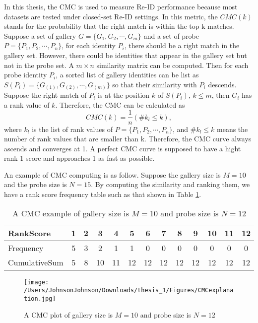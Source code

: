 In this thesis, the CMC is used to measure Re-ID performance because most datasets are tested under closed-set Re-ID settings. In this metric, the $CMC(k)$ stands for the probability that the right match is within the top k matches. Suppose a set of gallery $G = \{G_1,G_2,\cdots,G_m\}$ and a set of probe $P = \{P_1,P_2,\cdots,P_n\}$, for each identity $P_i$, there should be a right match in the gallery set. However, there could be identities that appear in the gallery set but not in the probe set. A $m\times n$ similarity matrix can be computed. Then for each probe identity $P_i$, a sorted list of gallery identities can be list as $S(P_i) = \{{G_{(1)},G_{(2)},\cdots,G_{(m)}}\}$ so that their similarity with $P_i$ descends. Suppose the right match of $P_i$ is at the position $k$ of $S(P_i)$, $k\le m$, then $G_i$ has a rank value of $k$. Therefore, the CMC can be calculated as 
\begin{equation}
CMC(k) = \frac{1}{n}(\#k_l\le k),
\end{equation}
where $k_l$ is the list of rank values of $P = \{P_1,P_2,\cdots,P_n\}$, and $\#k_l\le k$ means the number of rank values that are smaller than k.  Therefore, the CMC curve always ascends and converges at 1.  A perfect CMC curve is supposed to have a hight rank 1 score and approaches 1 as fast as possible.

An example of CMC computing is as follow. Suppose the gallery size is $M=10$ and the probe size is $N=15$. By computing the similarity and ranking them, we have a rank score frequency table such  as that shown in Table \ref{CMCcomputingdemo}.
\begin{table}[H]
\centering
\caption{A CMC example of gallery size is $M=10$ and probe size is $N=12$}
\label{CMCcomputingdemo}
\begin{tabular}{|l|c|c|c|c|c|c|c|c|c|c|c|c|}
\hline
RankScore &1&2&3&4&5&6&7&8&9&10&11&12\\
\hline
Frequency &5&3&2&1&1&0&0&0&0&0&0&0\\
\hline
CumulativeSum&5&8&10&11&12&12&12&12&12&12&12&12\\
\hline
\end{tabular}
\end{table}

\begin{figure}[H]
\centering
\texttt{[image: /Users/JohnsonJohnson/Downloads/thesis\_1/Figures/CMCexplanation.jpg]}
\caption{A CMC plot of  gallery size is $M=10$ and probe size is $N=12$}
\label{CMCexplanationplot}
\vspace{-1em}
\end{figure} 






